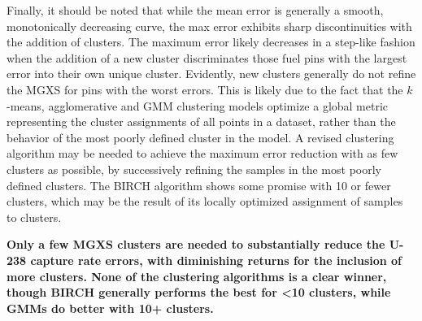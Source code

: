 Finally, it should be noted that while the mean error is generally a smooth, monotonically decreasing curve, the max error exhibits sharp discontinuities with the addition of clusters. The maximum error likely decreases in a step-like fashion when the addition of a new cluster discriminates those fuel pins with the largest error into their own unique cluster. Evidently, new clusters generally do not refine the \ac{MGXS} for pins with the worst errors. This is likely due to the fact that the $k$-means, agglomerative and \ac{GMM} clustering models optimize a global metric representing the cluster assignments of all points in a dataset, rather than the behavior of the most poorly defined cluster in the model. A revised clustering algorithm may be needed to achieve the maximum error reduction with as few clusters as possible, by successively refining the samples in the most poorly defined clusters. The BIRCH algorithm shows some promise with 10 or fewer clusters, which may be the result of its locally optimized assignment of samples to clusters.

\begin{emphbox}
\textbf{Only a few \ac{MGXS} clusters are needed to substantially reduce the U-238 capture rate errors, with diminishing returns for the inclusion of more clusters. None of the clustering algorithms is a clear winner, though BIRCH generally performs the best for <10 clusters, while \acp{GMM} do better with 10+ clusters.}
\end{emphbox}



